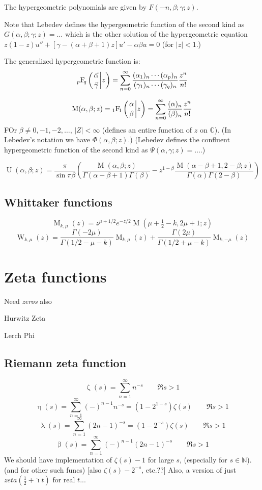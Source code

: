 \documentclass[10pt,dvipdfmx,letterpaper,twoside]{article}
\let\O=\operatorname
\newcommand{\CC}{{\mathbb{C}}}
\newcommand{\NN}{{\mathbb{N}}}
\newcommand{\ii}{{\hat{\imath}}}
\newcommand{\Hyper}[5]{{\mathop{{}_{#1}\!\O{F\!}_{#2}\left({\genfrac{}{}{0pt}{}{#3}{#4}}\middle|{#5}\right)}}}
\let\al=\alpha
\let\gam=\gamma
\let\Gam=\Gamma
\begin{document}
The hypergeometric polynomials are given by $F(-n,\beta;\gam;z)$.

Note that Lebedev defines the hypergeometric function of the second kind as $G(\al,\beta;\gam;z) = \dots$ which is the
other solution of the hypergeometric equation $z(1-z)u'' + [\gam-(\al+\beta+1)z]u' - \al\beta u=0$ (for $|z|<1$.)

The generalized hypergeometric function is:
\[ \Hyper{p}{q}{\vec{\al}}{\vec{\gam}}{z} = \sum_{n=0}^\infty \frac{(\al_1)_n\cdots(\al_p)_n}{(\gam_1)_n\cdots(\gam_q)_n} \frac{z^n}{n!} \]

\[ \O{M}(\al, \beta; z) = \Hyper{1}{1}{\al}{\beta}{z} = \sum_{n=0}^\infty \frac{(\al)_n}{(\beta)_n} \frac{z^n}{n!} \]
FOr $\beta\neq0,-1,-2,\dots$, $|Z|<\infty$ (defines an entire function of $z$ on $\CC$).
(In Lebedev's notation we have $\Phi(\al,\beta;z)$.)
(Lebedev defines the confluent hypergeometric function of the second kind as $\Psi(\al,\gam;z) = \dots$.)

\[ \O{U}(\al, \beta; z) = \frac{\pi}{\sin \pi\beta}\left( \frac{\O{M}(\al, \beta; z)}{\Gam(\al-\beta+1)\Gam(\beta)}
  - z^{1-\beta}\frac{\O{M}(\al-\beta+1, 2-\beta; z)}{\Gam(\al) \Gam(2-\beta)} \right) \]

\subsection{Whittaker functions}
\[ \O{M}_{k,\mu}(z) = z^{\mu+1/2}e^{-z/2} \O{M}(\mu+\tfrac12-k, 2\mu+1; z) \]
\[ \O{W}_{k,\mu}(z) = \frac{\Gam(-2\mu)}{\Gam(1/2 - \mu - k)}\O{M}_{k,\mu}(z) + \frac{\Gam(2\mu)}{\Gam(1/2 + \mu - k)}\O{M}_{k,-\mu}(z) \]

\section{Zeta functions}
Need {\em zeros} also

Hurwitz Zeta

Lerch Phi

\subsection{Riemann zeta function}
\[ \O{\zeta}(s) = \sum_{n=1}^\infty n^{-s} \qquad \Re s>1 \]
\[ \O{\eta}(s) =  \sum_{n=1}^\infty (-)^{n-1}n^{-s} = (1-2^{1-s})\zeta(s) \qquad \Re s>1 \]
\[ \O{\lambda}(s) =  \sum_{n=1}^\infty (2n-1)^{-s} = (1-2^{-s})\zeta(s) \qquad \Re s>1 \]
\[ \O{\beta}(s) =  \sum_{n=1}^\infty (-)^{n-1}(2n-1)^{-s} \qquad \Re s>1 \]
We should have implementation of $\zeta(s)-1$ for large $s$, (especially for $s\in\NN$).
(and for other such funcs) [also $\zeta(s)-2^{-s}$, etc.??]
Also, a version of just $zeta(\tfrac12 + \ii t)$ for real $t$...
\end{document}
